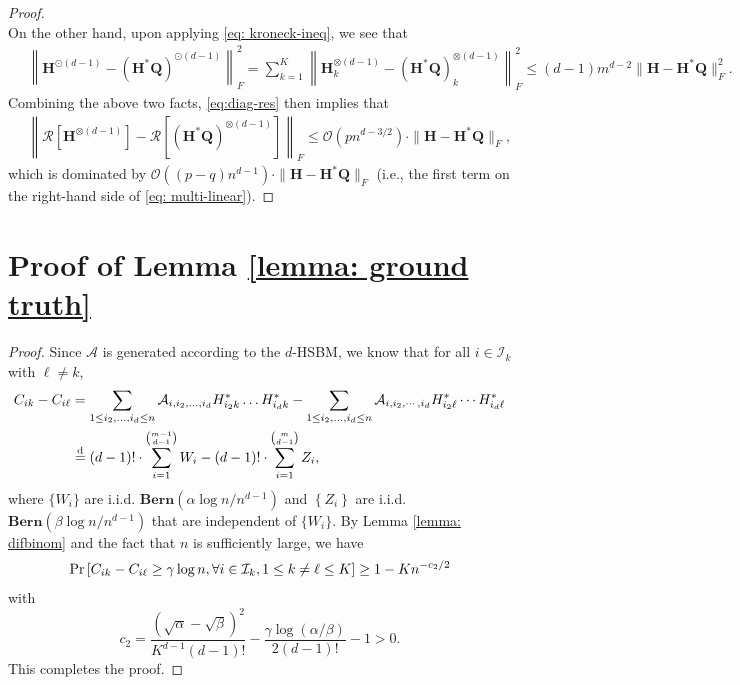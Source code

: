 \documentclass{article}
\theoremstyle{plain}
\theoremstyle{definition}
\theoremstyle{remark}
\newcommand{\BQ}{\bm{Q}}
\newcommand{\OCal}{\mathcal{O}}
\newcommand{\ICal}{\mathcal{I}}
\newcommand{\ACal}{\mathcal{A}}
\newcommand{\RCal}{\mathcal{R}}
\begin{document}
\begin{appendix}
\begin{center}
\begin{proof}
\begin{equation*}
	\end{equation*}
	On the other hand, upon applying \eqref{eq: kroneck-ineq}, we see that
	\begin{align*}
		\quad \left\| \bm{H}^{\odot (d-1)} - (\bm{H}^*\bm{Q})^{\odot (d-1)} \right\|_F^2 = \sum_{k=1}^K\left\| \bm{H}_k^{\otimes (d-1)} - (\bm{H}^*\bm{Q})_k^{\otimes (d-1)} \right\|_F^2 \le (d-1)m^{d-2}\|\bm{H} - \bm{H}^*\BQ\|_F^2.
	\end{align*}
	Combining the above two facts, \eqref{eq:diag-res} then implies that
	\begin{align*}
		\quad \left\| \RCal\left[\bm{H}^{\otimes (d-1)}\right] - \RCal\left[ (\bm{H}^*\BQ)^{\otimes (d-1)}\right] \right\|_F
		 \leq \OCal(pn^{d-3/2}) \cdot \|\bm{H} - \bm{H}^*\BQ\|_F,
	\end{align*}
	which is dominated by $\OCal((p-q)n^{d-1}) \cdot \|\bm{H} - \bm{H}^*\BQ\|_F $ (i.e., the first term on the right-hand side of \eqref{eq: multi-linear}).
\end{proof}

 \section{Proof of Lemma \ref{lemma: ground truth}} 
		\begin{proof}
			Since $\ACal$ is generated according to the $d$-HSBM, we know that for all $i \in \ICal_k$ with $\ell\neq k$,
			\begin{align}
				C_{ik} - C_{i\ell} & = \sum_{1 \leq i_2,\dots,i_d \leq n} \ACal_{i,i_2,\dots,i_d} H^*_{i_2k}\dots H^*_{i_dk} - \sum_{1 \leq i_2,\dots,i_d \leq n} \ACal_{i,i_2,\cdots,i_d} H^*_{i_2\ell}\cdots H^*_{i_d\ell} \\
				& \overset{\textnormal{d}}{=} (d-1)! \cdot \sum_{i=1}^{\binom{m-1}{d-1}} W_i - (d-1)! \cdot \sum_{i=1}^{\binom{m}{d-1}} Z_i, \label{eq: diffbinomial}
			\end{align}
			where $\{W_i\}$ are i.i.d. $\mathbf{Bern}(\alpha \log n / n^{d-1})$ and $\left\{Z_{i}\right\}$ are i.i.d. $\mathbf{Bern}(\beta \log n / n^{d-1})$ that are independent of $\{W_i\}$. By Lemma \ref{lemma: difbinom} and the fact that $n$ is sufficiently large, we have
			\begin{align}
				{\rm Pr}\left[C_{i k}-C_{i \ell} \geq \gamma \log n, \forall i \in \mathcal{I}_{k}, 1 \leq k \neq \ell \leq K\right] \geq 1-K n^{-c_{2}/2}
			\end{align}
			with 
			\begin{equation} \label{eq: c2def}
				c_2 = \frac{(\sqrt{\alpha}-\sqrt{\beta})^{2}}{K^{d-1} (d-1)!}-\frac{\gamma \log (\alpha / \beta)}{2(d-1)!}-1 >0.
			\end{equation}
			This completes the proof.
		\end{proof}

\end{center}
\end{appendix}
\end{document}
